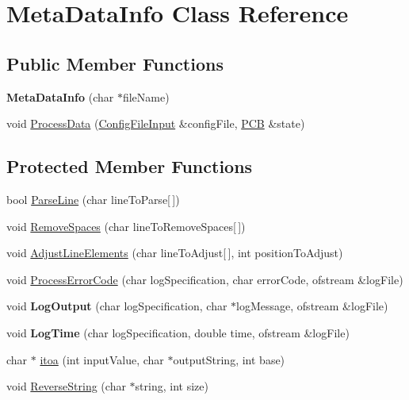 \hypertarget{class_meta_data_info}{}\section{Meta\+Data\+Info Class Reference}
\label{class_meta_data_info}
\subsection*{Public Member Functions}
\begin{DoxyCompactItemize}
\item 
{\bfseries Meta\+Data\+Info} (char $\ast$file\+Name)\hypertarget{class_meta_data_info_af98d5c5b43cd3bcd86438554ea91751e}{}\label{class_meta_data_info_af98d5c5b43cd3bcd86438554ea91751e}

\item 
void \hyperlink{class_meta_data_info_a9ff5c26cf9387410fc7326bde2b05e1d}{Process\+Data} (\hyperlink{class_config_file_input}{Config\+File\+Input} \&config\+File, \hyperlink{class_p_c_b}{P\+CB} \&state)
\end{DoxyCompactItemize}
\subsection*{Protected Member Functions}
\begin{DoxyCompactItemize}
\item 
bool \hyperlink{class_meta_data_info_a56a4ddcd4429a6324c7715e8deb199f1}{Parse\+Line} (char line\+To\+Parse\mbox{[}$\,$\mbox{]})
\item 
void \hyperlink{class_meta_data_info_a525056e90a718a3f42147b0ec8c9456a}{Remove\+Spaces} (char line\+To\+Remove\+Spaces\mbox{[}$\,$\mbox{]})
\item 
void \hyperlink{class_meta_data_info_ad22e892de632d1d0800099e7daf7c941}{Adjust\+Line\+Elements} (char line\+To\+Adjust\mbox{[}$\,$\mbox{]}, int position\+To\+Adjust)
\item 
void \hyperlink{class_meta_data_info_a5bc8f03132a3a575433517cc1de3295d}{Process\+Error\+Code} (char log\+Specification, char error\+Code, ofstream \&log\+File)
\item 
void {\bfseries Log\+Output} (char log\+Specification, char $\ast$log\+Message, ofstream \&log\+File)\hypertarget{class_meta_data_info_a6150ce3a4dd26ea2326eb838ef9fef6f}{}\label{class_meta_data_info_a6150ce3a4dd26ea2326eb838ef9fef6f}

\item 
void {\bfseries Log\+Time} (char log\+Specification, double time, ofstream \&log\+File)\hypertarget{class_meta_data_info_ad3c6ae239217ba112655adc9a72b2782}{}\label{class_meta_data_info_ad3c6ae239217ba112655adc9a72b2782}

\item 
char $\ast$ \hyperlink{class_meta_data_info_afa768773ce2a23be28e0451983911e33}{itoa} (int input\+Value, char $\ast$output\+String, int base)
\item 
void \hyperlink{class_meta_data_info_a03d279a6dc693da0099cf016541b34eb}{Reverse\+String} (char $\ast$string, int size)
\end{DoxyCompactItemize}


